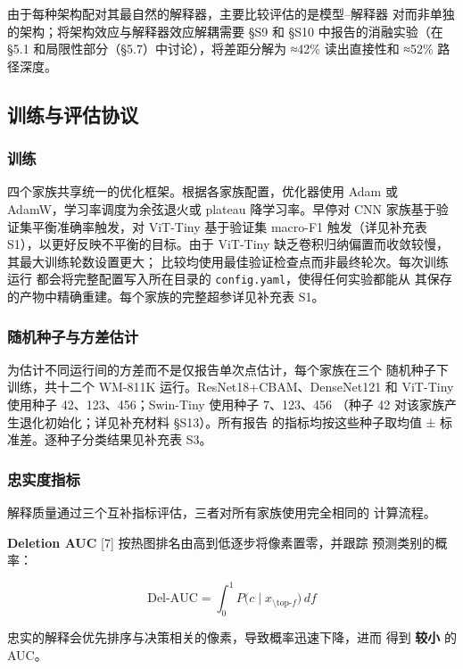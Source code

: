 \documentclass[11pt,a4paper]{article}
\begin{document}
由于每种架构配对其最自然的解释器，主要比较评估的是模型–解释器 对而非单独的架构；将架构效应与解释器效应解耦需要 §S9 和 §S10 中报告的消融实验（在 §5.1 和局限性部分（§5.7）中讨论），将差距分解为 ≈42\% 读出直接性和 ≈52\% 路径深度。


\subsection{训练与评估协议}

\subsubsection{训练}

四个家族共享统一的优化框架。根据各家族配置，优化器使用 Adam 或 AdamW，学习率调度为余弦退火或 plateau 降学习率。早停对 CNN 家族基于验证集平衡准确率触发，对 ViT-Tiny 基于验证集 macro-F1 触发（详见补充表 S1），以更好反映不平衡的目标。由于 ViT-Tiny 缺乏卷积归纳偏置而收敛较慢，其最大训练轮数设置更大； 比较均使用最佳验证检查点而非最终轮次。每次训练运行 都会将完整配置写入所在目录的 \texttt{config.yaml}，使得任何实验都能从 其保存的产物中精确重建。每个家族的完整超参详见补充表 S1。

\subsubsection{随机种子与方差估计}

为估计不同运行间的方差而不是仅报告单次点估计，每个家族在三个 随机种子下训练，共十二个 WM-811K 运行。ResNet18+CBAM、DenseNet121 和 ViT-Tiny 使用种子 42、123、456；Swin-Tiny 使用种子 7、123、456 （种子 42 对该家族产生退化初始化；详见补充材料 §S13）。所有报告 的指标均按这些种子取均值 ± 标准差。逐种子分类结果见补充表 S3。


\subsubsection{忠实度指标}

解释质量通过三个互补指标评估，三者对所有家族使用完全相同的 计算流程。

\textbf{Deletion AUC} [7] 按热图排名由高到低逐步将像素置零，并跟踪 预测类别的概率：

\begin{equation}
\text{Del-AUC} = \int_0^1 P\bigl(c \mid x_{\setminus \text{top-}f}\bigr)\, df
\tag{13}
\end{equation}

忠实的解释会优先排序与决策相关的像素，导致概率迅速下降，进而 得到 \textbf{较小} 的 AUC。
\end{document}
